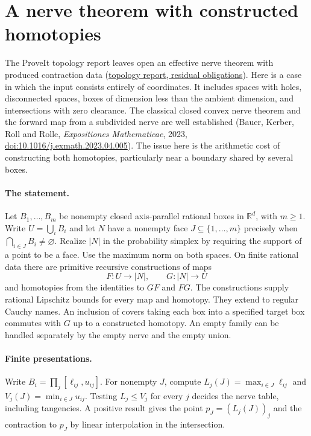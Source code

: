 \section{A nerve theorem with constructed homotopies}
\label{sec:boxnerve}

The ProveIt topology report leaves open an effective nerve theorem with
produced contraction data (\href{https://github.com/VladimirReshetnikov/ProveIt/blob/5f3be02388442f16487d2dc5c2529961dd783d2b/Logic/PrimitiveRecursiveArithmetic/docs/proofs/topology/ipra_topology_framework_2026-11-15/paper/sections/12_limits.tex}{topology report, residual obligations}). Here is a case in which the input consists
entirely of coordinates. It includes spaces with holes, disconnected
spaces, boxes of dimension less than the ambient dimension, and
intersections with zero clearance. The classical closed convex nerve
theorem and the forward map from a subdivided nerve are well established
(Bauer, Kerber, Roll and Rolle, \emph{Expositiones Mathematicae}, 2023,
\href{https://doi.org/10.1016/j.exmath.2023.04.005}{doi:10.1016/j.exmath.2023.04.005}).
The issue here is the arithmetic cost of constructing both homotopies,
particularly near a boundary shared by several boxes.

\paragraph{The statement.}
Let $B_1,\ldots,B_m$ be nonempty closed axis-parallel rational boxes in
$\mathbb R^d$, with $m\geq1$. Write $U=\bigcup_i B_i$ and let $N$ have a
nonempty face $J\subseteq\{1,\ldots,m\}$ precisely when
$\bigcap_{i\in J} B_i\ne\varnothing$. Realize $|N|$ in the probability
simplex by requiring the support of a point to be a face. Use the maximum
norm on both spaces. On finite rational data there are primitive recursive
constructions of maps
\[
 F:U\longrightarrow |N|,\qquad G:|N|\longrightarrow U
\]
and homotopies from the identities to $GF$ and $FG$. The constructions
supply rational Lipschitz bounds for every map and homotopy. They extend
to regular Cauchy names. An inclusion of covers taking each box into a specified
target box commutes with $G$ up to a constructed homotopy. An empty
family can be handled separately by the empty nerve and the empty union.

\paragraph{Finite presentations.}
Write $B_i=\prod_j[\ell_{ij},u_{ij}]$. For nonempty $J$, compute
$L_j(J)=\max_{i\in J}\ell_{ij}$ and
$V_j(J)=\min_{i\in J}u_{ij}$. Testing $L_j\leq V_j$ for every $j$
decides the nerve table, including tangencies. A positive result gives
the point $p_J=(L_j(J))_j$ and the contraction to $p_J$ by linear
interpolation in the intersection.

